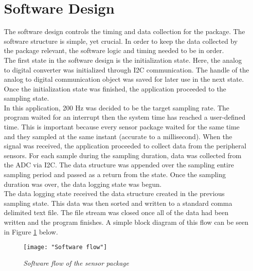 \section{Software Design}
The software design controls the timing and data collection for the
package. The software structure is simple, yet crucial. In order to
keep the data collected by the package relevant, the software
logic and timing needed to be in order. \\

The first state in the software design is the initialization state.
Here, the analog to digital converter was initialized through I2C
communication. The handle of the analog to digital communication
object was saved for later use in the next state. Once the
initialization state was finished, the application proceeded
to the sampling state.\\

In this application, 200 Hz was decided to be the target sampling
rate. The program waited for an interrupt then the system time 
has reached a user-defined time. This is important because every 
sensor package waited for the same time and they sampled  
at the same instant (accurate to a millisecond). When the signal was received, 
the application proceeded to collect data from the peripheral sensors. For
each sample during the sampling duration, data was collected
from the ADC via I2C. The data structure was appended over the sampling entire
sampling period and passed as a return from the state.
Once the sampling duration was over, the data logging
state was begun. \\

The data logging state received the data structure created in the
previous sampling state. This data was then sorted and written to a
standard comma delimited text file. The file stream was closed
once all of the data had been written and the program finishes. A
simple block diagram of this flow can be seen in Figure
\ref{fig:PRO_SoftFlow} below.

\begin{figure}[H]
\centering
\texttt{[image: "Software flow"]}
\caption{\textit{Software flow of the sensor package}}
\label{fig:PRO_SoftFlow}
\end{figure}